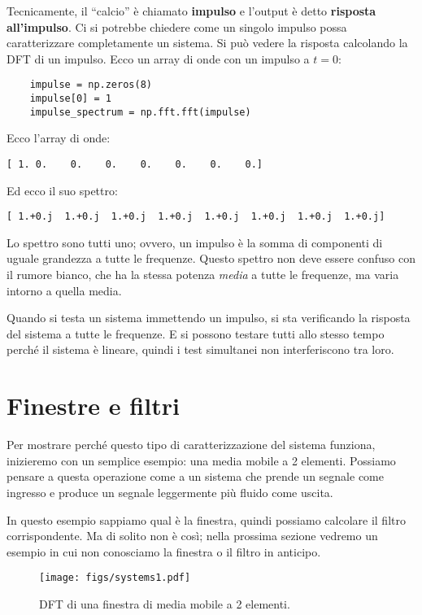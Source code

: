 \documentclass[12pt,a4paper]{book}
\begin{document}
Tecnicamente, il ``calcio'' è chiamato {\bf impulso} e l'output è detto {\bf risposta all'impulso}. Ci si potrebbe chiedere come un singolo impulso possa caratterizzare completamente un sistema. Si può vedere la risposta calcolando la DFT di un impulso. Ecco un array di onde con un impulso a $t=0$:

\begin{verbatim} 
    impulse = np.zeros(8)
    impulse[0] = 1
    impulse_spectrum = np.fft.fft(impulse)
 \end{verbatim} 

Ecco l'array di onde:

\begin{verbatim} 
[ 1. 0.    0.    0.    0.    0.    0.    0.]
 \end{verbatim} 

Ed ecco il suo spettro:

\begin{verbatim} 
[ 1.+0.j  1.+0.j  1.+0.j  1.+0.j  1.+0.j  1.+0.j  1.+0.j  1.+0.j]
 \end{verbatim} 

Lo spettro sono tutti uno; ovvero, un impulso è la somma di componenti di uguale grandezza a tutte le frequenze. Questo spettro non deve essere confuso con il rumore bianco, che ha la stessa potenza {\em media} a tutte le frequenze, ma varia intorno a quella media.

Quando si testa un sistema immettendo un impulso, si sta verificando la risposta del sistema a tutte le frequenze. E si possono testare tutti allo stesso tempo perché il sistema è lineare, quindi i test simultanei non interferiscono tra loro.

\section{Finestre e filtri} \label{winfilt} 

Per mostrare perché questo tipo di caratterizzazione del sistema funziona, inizieremo con un semplice esempio: una media mobile a 2 elementi. Possiamo pensare a questa operazione come a un sistema che prende un segnale come ingresso e produce un segnale leggermente più fluido come uscita.

In questo esempio sappiamo qual è la finestra, quindi possiamo calcolare il filtro corrispondente. Ma di solito non è così; nella prossima sezione vedremo un esempio in cui non conosciamo la finestra o il filtro in anticipo.

\begin{figure} 

\centerline{\texttt{[image: figs/systems1.pdf]}} \caption{DFT di una finestra di media mobile a 2 elementi.} \label{fig.systems1} \end{figure} 
\end{document}
